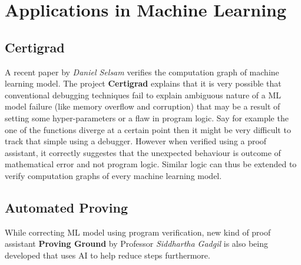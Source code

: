 \chapter{Applications in Machine Learning }

\section{Certigrad}
A recent paper\cite{certigrad} by \textit{Daniel Selsam} verifies the computation graph of machine learning model. The project \textbf{Certigrad}\cite{certigrad_video} explains that it is very possible that conventional debugging techniques fail to explain ambiguous nature of a ML model failure (like memory overflow and corruption) that may be a result of setting some hyper-parameters or a flaw in program logic. Say for example the one of the functions diverge at a certain point then it might be very difficult to track that simple using a debugger. However when verified using a proof assistant, it correctly suggestes that the unexpected behaviour is outcome of mathematical error and not program logic. Similar logic can thus be extended to verify computation graphs of every machine learning model. 

\section{Automated Proving}
While correcting ML model using program verification, new kind of proof assistant \textbf{Proving Ground}\cite{provingground} by Professor \textit{Siddhartha Gadgil} is also being developed that uses AI to help reduce steps furthermore.
